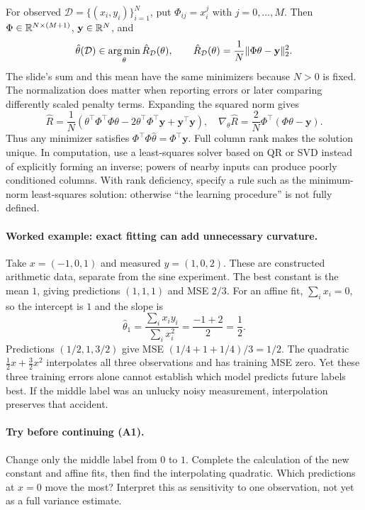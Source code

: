 For observed $\mathcal D=\{(x_i,y_i)\}_{i=1}^N$, put $\Phi_{ij}=x_i^j$ with $j=0,\ldots,M$. Then $\Phi\in\mathbb{R}^{N\times(M+1)}$, $\mathbf y\in\mathbb{R}^N$, and
\begin{equation}
\hat\theta(\mathcal D)\in\operatorname*{arg\,min}_\theta
\hat R_{\mathcal D}(\theta),\qquad
\hat R_{\mathcal D}(\theta)=\frac1N\|\Phi\theta-\mathbf y\|_2^2.
\end{equation}
The slide's sum and this mean have the same minimizers because $N>0$ is fixed. The normalization does matter when reporting errors or later comparing differently scaled penalty terms.
Expanding the squared norm gives
\[
\hat R=\frac1N(\theta^\top\Phi^\top\Phi\theta-2\theta^\top\Phi^\top\mathbf y+\mathbf y^\top\mathbf y),\quad
\nabla_\theta\hat R=\frac2N\Phi^\top(\Phi\theta-\mathbf y).
\]
Thus any minimizer satisfies $\Phi^\top\Phi\hat\theta=\Phi^\top\mathbf y$. Full column rank makes the solution unique. In computation, use a least-squares solver based on QR or SVD instead of explicitly forming an inverse; powers of nearby inputs can produce poorly conditioned columns. With rank deficiency, specify a rule such as the minimum-norm least-squares solution: otherwise ``the learning procedure'' is not fully defined.

\paragraph{Worked example: exact fitting can add unnecessary curvature.}
Take $x=(-1,0,1)$ and measured $y=(1,0,2)$. These are constructed arithmetic data, separate from the sine experiment. The best constant is the mean $1$, giving predictions $(1,1,1)$ and MSE $2/3$. For an affine fit, $\sum_i x_i=0$, so the intercept is $1$ and the slope is
\[
\hat\theta_1=\frac{\sum_i x_i y_i}{\sum_i x_i^2}=\frac{-1+2}{2}=\frac12.
\]
Predictions $(1/2,1,3/2)$ give MSE $(1/4+1+1/4)/3=1/2$. The quadratic $\tfrac12x+\tfrac32x^2$ interpolates all three observations and has training MSE zero. Yet these three training errors alone cannot establish which model predicts future labels best. If the middle label was an unlucky noisy measurement, interpolation preserves that accident.

\paragraph{Try before continuing (A1).} Change only the middle label from $0$ to $1$. Complete the calculation of the new constant and affine fits, then find the interpolating quadratic. Which predictions at $x=0$ move the most? Interpret this as sensitivity to one observation, not yet as a full variance estimate.

